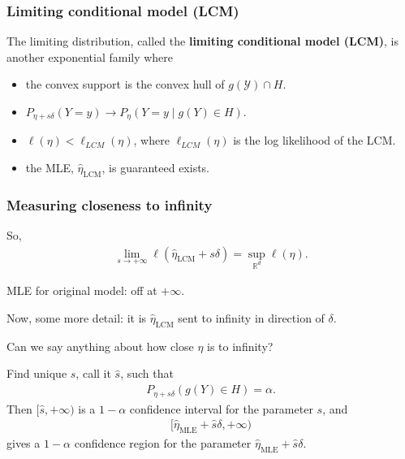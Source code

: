 \documentclass[slidestop,compress, 10pt]{beamer}
\def\RR{{\mathbb R}}
\def\YY{{\mathcal Y}}
\newcommand{\etaMLE}{\hat{\eta}_{\textrm{MLE}}}
\newcommand{\etaLCM}{\hat{\eta}_{\textrm{LCM}}}
\begin{document}
\frame
{
  \frametitle{Limiting conditional model (LCM)}  
	The limiting distribution, called the \textbf{limiting conditional model (LCM)}, is another exponential family where
	\begin{itemize}
		\item the convex support is the convex hull of $g(\YY) \cap H$.
		\item $P_{\eta + s \delta}( Y = y) \to P_{\eta}( Y =y \mid g(Y) \in H)$.
		\item $\ell(\eta) < \ell_{LCM}(\eta)$, where $\ell_{LCM}(\eta)$ is the log likelihood of the LCM.
		\item the MLE, $\etaLCM$, is guaranteed exists.
	\end{itemize}
}
\frame
{
  \frametitle{Measuring closeness to infinity}  
So,
\begin{align*}
	\lim_{s \to +\infty} \ell(\etaLCM + s\delta) = \sup_{\RR^d} \ell(\eta).
\end{align*}	

MLE for original model: off at $+\infty$.

Now, some more detail: it is $\etaLCM$ sent to infinity in direction of $\delta$.
\vspace{2mm}

Can we say anything about how close $\eta$ is to infinity?  

Find unique $s$, call it $\hat{s}$, such that
\begin{align*}
		P_{\eta + s \delta}( g(Y) \in H) = \alpha.
\end{align*}
Then $[ \hat{s}, +\infty)$ is a $1- \alpha$ confidence interval for the parameter $s$, and
\begin{align*}
[ \etaMLE + \hat{s} \delta, + \infty)
\end{align*}
gives a $1 - \alpha$ confidence region for the parameter $\etaMLE + \hat{s} \delta$.
}
\end{document}
